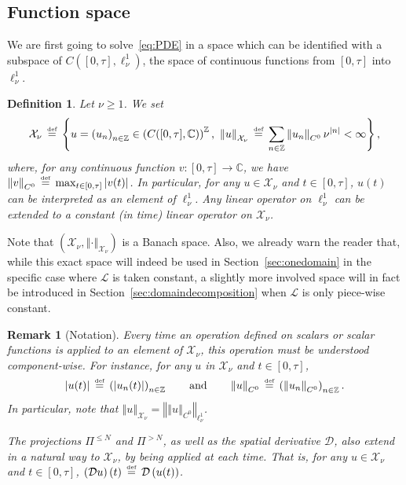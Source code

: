 \documentclass[10pt,a4paper]{article}
\theoremstyle{plain}
\newtheorem{remark}[theorem]{Remark}
\newtheorem{definition}[theorem]{Definition}
\newcommand{\ZZ}{\mathbb Z}
\newcommand{\CC}{\mathbb C}
\renewcommand{\L}{\mathcal{L}}
\newcommand{\D}{\mathcal{D}}
\newcommand{\X}{\mathcal{X}}
\newcommand{\1}{\mathbf{1}}
\newcommand{\bydef}{\,\stackrel{\mbox{\tiny\textnormal{\raisebox{0ex}[0ex][0ex]{def}}}}{=}\,}
\begin{document}
\subsection{Function space}
\label{sec:preliminaries_Xnu}

We are first going to solve~\eqref{eq:PDE} in a space which can be identified with a subspace of $C([0,\tau],\ell^1_\nu)$, the space of continuous functions from $[0,\tau]$ into $\ell^{1}_{\nu}$. 

\begin{definition}
\label{def:Xnu}
Let $\nu\geq 1$. We set
\begin{align*}
\X_\nu \bydef \left\{ u = \left(u_n\right)_{n\in\ZZ}\in \left(C([0,\tau],\CC)\right)^\ZZ,\ \left\Vert u\right\Vert_{\X_\nu} \bydef \sum_{n\in\ZZ} \left\Vert u_n\right\Vert_{C^0} \nu^{\vert n\vert} < \infty \right\},
\end{align*}
where, for any continuous function $v:[0,\tau] \to \CC$, we have
$\left\Vert v\right\Vert_{C^0} \bydef \max_{t\in [0,\tau]} \left\vert v(t)\right\vert$.
In particular, for any $u\in\X_\nu$ and $t\in[0,\tau]$, $u(t)$ can be interpreted as an element of $\ell^1_\nu$. Any linear operator on $\ell^1_\nu$ can be extended to a \emph{constant} (in time) linear operator on $\X_\nu$.
\end{definition}
\noindent Note that $\left(\X_\nu,\left\Vert \cdot\right\Vert_{\X_\nu}\right)$ is a Banach space. Also, we already warn the reader that, while this exact space will indeed be used in Section~\ref{sec:onedomain} in the specific case where $\L$ is taken constant, a slightly more involved space will in fact be introduced in Section~\ref{sec:domaindecomposition} when $\L$ is only piece-wise constant.

\begin{remark}[Notation]
Every time an operation defined on scalars or scalar functions is applied to an element of $\X_\nu$, this operation must be understood component-wise. For instance, for any $u$ in $\X_\nu$ and $t\in[0,\tau]$,
\begin{align*}
\vert u(t)\vert \bydef \left(\left\vert u_n(t)\right\vert\right)_{n\in\ZZ}\qquad \text{and}\qquad \left\Vert u\right\Vert_{C^0} \bydef \left(\left\Vert u_n\right\Vert_{C^0}\right)_{n\in\ZZ}.
\end{align*} 
In particular, note that $\left\Vert u\right\Vert_{\X_\nu} = \left\Vert\left\Vert u\right\Vert_{C^0}\right\Vert_{\ell^1_\nu}$.

The projections $\Pi^{\leq N}$ and $\Pi^{> N}$, as well as the spatial derivative $\D$, also extend in a natural way to $\X_\nu$, by being applied at each time. That is, for any $u\in\X_\nu$ and $t\in[0,\tau]$, $\left(\D u\right)(t)\bydef \D\left(u(t)\right)$.
\end{remark}
\end{document}
